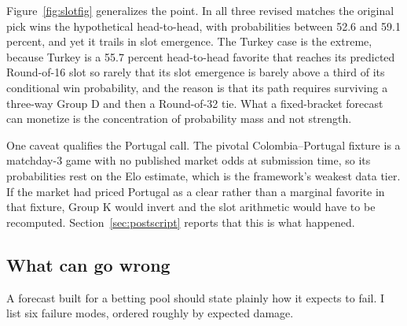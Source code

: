 \documentclass[11pt,letterpaper]{article}
\begin{document}
Figure~\ref{fig:slotfig} generalizes the point. In all three revised matches the original pick wins the hypothetical head-to-head, with probabilities between 52.6 and 59.1 percent, and yet it trails in slot emergence. The Turkey case is the extreme, because Turkey is a 55.7 percent head-to-head favorite that reaches its predicted Round-of-16 slot so rarely that its slot emergence is barely above a third of its conditional win probability, and the reason is that its path requires surviving a three-way Group D and then a Round-of-32 tie. What a fixed-bracket forecast can monetize is the concentration of probability mass and not strength.

One caveat qualifies the Portugal call. The pivotal Colombia--Portugal fixture is a matchday-3 game with no published market odds at submission time, so its probabilities rest on the Elo estimate, which is the framework's weakest data tier. If the market had priced Portugal as a clear rather than a marginal favorite in that fixture, Group K would invert and the slot arithmetic would have to be recomputed. Section~\ref{sec:postscript} reports that this is what happened.

\subsection{What can go wrong}

A forecast built for a betting pool should state plainly how it expects to fail. I list six failure modes, ordered roughly by expected damage.
\end{document}
